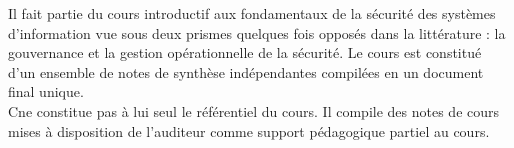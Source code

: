 

Il fait partie du cours introductif aux fondamentaux de la sécurité des systèmes d'information vue sous deux prismes quelques fois opposés dans la littérature : la gouvernance et la gestion opérationnelle de la sécurité.
Le cours est constitué d'un ensemble de notes de synthèse indépendantes compilées en un document final unique.\\
C\edoc ne constitue pas à lui seul le référentiel du cours. Il compile des notes de cours mises à disposition de l'auditeur comme support pédagogique partiel au cours.